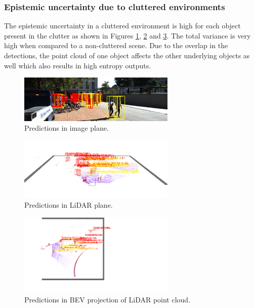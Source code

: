 \documentclass[10pt,twocolumn,letterpaper]{article}
\begin{document}
\subsubsection{Epistemic uncertainty due to cluttered environments}
The epistemic uncertainty in a cluttered environment is high for each object present in the clutter as shown in Figures \ref{fig:Uncert_blockage-2_1}, \ref{fig:Uncert_blockage-2_2} and \ref{fig:Uncert_blockage-2_3}. The total variance is very high when compared to a non-cluttered scene. Due to the overlap in the detections, the point cloud of one object affects the other underlying objects as well which also results in high entropy outputs.
\begin{figure}[!htbp]
        \centering
		\includegraphics[width=75mm, scale = 0.4]{images/Uncertainty_results/5226_cluttered_bbox.png}
        \caption[Extracted frustum point cloud after Normalization]{Predictions in image plane.}
        \label{fig:Uncert_blockage-2_1}
\end{figure}
\begin{figure}[!htbp]
        \centering
		\includegraphics[width=75mm, scale = 0.4]{images/Uncertainty_results/5226_Follow_cam_view.png}
        \caption[Extracted frustum point cloud after Normalization]{Predictions in LiDAR plane.}
        \label{fig:Uncert_blockage-2_2}
\end{figure}
\begin{figure}[!htbp]
        \centering
		\includegraphics[width=75mm,scale = 0.4]{images/Uncertainty_results/5226_cluttered.png}
        \caption[Extracted frustum point cloud after Normalization]{Predictions in BEV projection of LiDAR point cloud.}
        \label{fig:Uncert_blockage-2_3}
\end{figure}
\end{document}
